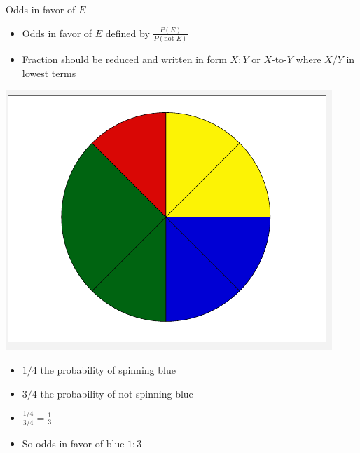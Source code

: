 \documentclass{beamer}
\theoremstyle{definition}
\begin{document}
\begin{frame}{Odds in favor of $E$}
\begin{definition}
\begin{itemize}
\item \alert{Odds in favor of $E$} defined by
$\frac{P\left(E\right)}{P\left(\text{not $E$}\right)}$
\item Fraction should be reduced and written
in form \alert{$X:Y$} or \alert{$X$-to-$Y$}
where $X/Y$ in lowest terms
\end{itemize}
\end{definition}
\begin{example}
\begin{multicols}{2}
\includegraphics[scale=.30]{Spinner}
\begin{itemize}
\item $1/4$ the probability of spinning blue
\item $3/4$ the probability of \alert{not} spinning blue
\item $\frac{1/4}{3/4}=\frac{1}{3}$
\item So odds in favor of blue $1:3$
\end{itemize}
\end{multicols}
\end{example}
\end{frame}
\end{document}
